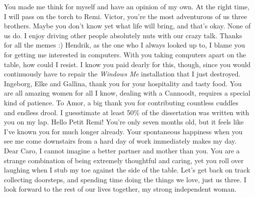 You made me think for myself and have an opinion of my own.
At the right time, I will pass on the torch to Remi.
\newperson
\newperson
Victor, you're the most adventurous of us three brothers.
Maybe you don't know yet what life will bring, and that's okay. None of us do.
I enjoy driving other people absolutely nuts with our crazy talk.
Thanks for all the memes :)
\newperson
\newperson
Hendrik, as the one who I always looked up to, I blame you for getting me interested
in computers. With you taking computers apart on the table, how could I resist.
I know you paid dearly for this, though, since you would continuously have to
repair the \textit{Windows Me} installation that I just destroyed.
\newperson
\newperson
Ingeborg, Elke and Gallina, thank you for your hospitality and tasty food.
You are all amazing women
for all I know, dealing with a Cannoodt,
requires a special kind of patience.
\newperson
\newperson
To Amor, a big thank you for contributing countless cuddles and endless drool.
I guesstimate at least 50\% of the dissertation was written with you on my lap.
\newperson
\newperson
Hello Petit Remi! 
You're only seven months old, but it feels like I've known you for much longer already.
Your spontaneous happiness when you see me come downstairs 
from a hard day of work immediately makes my day.
\newperson
\newperson
Dear Caro,
I cannot imagine a better partner and mother than you.
You are a strange combination of being extremely thoughtful and caring,
yet you roll over laughing when I stub my toe against the side of the table.
Let's get back on track collecting doorsteps,
and spending time doing the things we love, just us three.
I look forward to the rest of our lives together,
my strong independent woman.








































